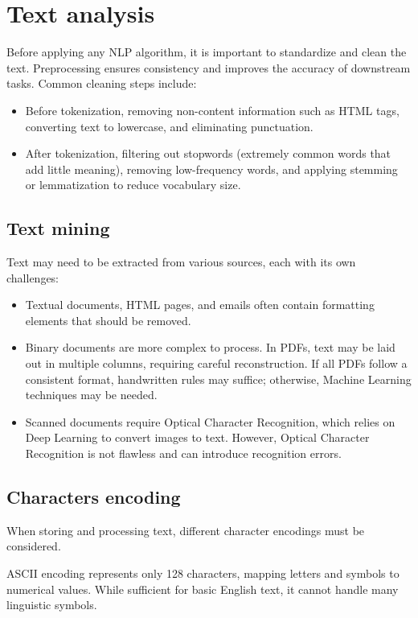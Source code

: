 \section{Text analysis}

Before applying any NLP algorithm, it is important to standardize and clean the text. 
Preprocessing ensures consistency and improves the accuracy of downstream tasks.
Common cleaning steps include:
\begin{itemize}
    \item Before tokenization, removing non-content information such as HTML tags, converting text to lowercase, and eliminating punctuation.
    \item After tokenization, filtering out stopwords (extremely common words that add little meaning), removing low-frequency words, and applying stemming or lemmatization to reduce vocabulary size. 
\end{itemize}

\subsection{Text mining}
Text may need to be extracted from various sources, each with its own challenges: 
\begin{itemize}
    \item Textual documents, HTML pages, and emails often contain formatting elements that should be removed. 
    \item Binary documents are more complex to process. 
        In PDFs, text may be laid out in multiple columns, requiring careful reconstruction. 
        If all PDFs follow a consistent format, handwritten rules may suffice; otherwise, Machine Learning techniques may be needed.
    \item Scanned documents require Optical Character Recognition, which relies on Deep Learning to convert images to text. 
        However, Optical Character Recognition is not flawless and can introduce recognition errors.
\end{itemize}

\subsection{Characters encoding}
When storing and processing text, different character encodings must be considered.

ASCII encoding represents only 128 characters, mapping letters and symbols to numerical values. 
While sufficient for basic English text, it cannot handle many linguistic symbols.

